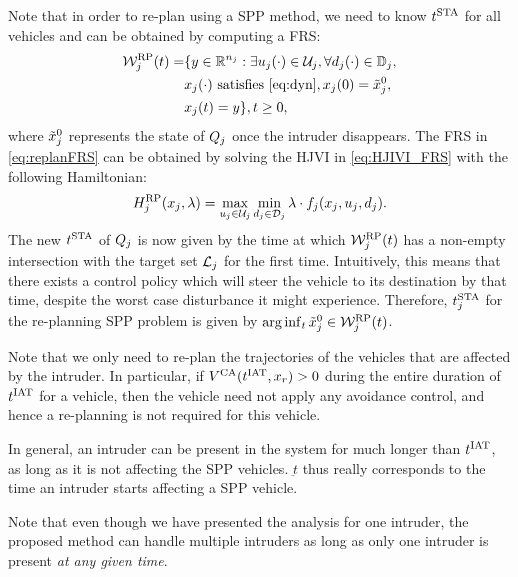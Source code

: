 Note that in order to re-plan using a SPP method, we need to know $t^\text{STA}$ for all vehicles and can be obtained by computing a FRS:
\begin{equation} \label{eq:replanFRS}
\begin{aligned} 
\frs_j^{\text{RP}}(t) = & \{y \in \R^{n_j}: \exists \ctrl_j(\cdot) \in \cset_j, \forall \dstb_j(\cdot) \in \dfset_j, \\
& \state_j(\cdot) \text{ satisfies \eqref{eq:dyn}}, \state_j(0) = \tilde{\state}_j^0, \\
& \state_j(t) = y\}, t \geq 0,
\end{aligned}
\end{equation}
where $\tilde{x}_j^0$ represents the state of $Q_j$ once the intruder disappears. The FRS in \eqref{eq:replanFRS} can be obtained by solving the HJVI in \eqref{eq:HJIVI_FRS} with the following Hamiltonian:
\begin{equation}
H_j^{\text{RP}}(x_j, \lambda) = \max_{u_j \in \mathcal{U}_j} \min_{d_j \in \mathcal{D}_j} \lambda \cdot f_j (x_j, u_j, d_j). 
\end{equation} 
The new $t^\text{STA}$ of $Q_j$ is now given by the time at which $\mathcal{W}_j^{\text{RP}}(t)$ has a non-empty intersection with the target set $\mathcal{L}_j$ for the first time. Intuitively, this means that there exists a control policy which will steer the vehicle to its destination by that time, despite the worst case disturbance it might experience. Therefore, $t^\text{STA}_j$ for the re-planning SPP problem is given by $\arg \inf_t \tilde{x}_j^0 \in \mathcal{W}_j^{\text{RP}}(t)$.

\begin{remark}
Note that we only need to re-plan the trajectories of the vehicles that are affected by the intruder. In particular, if $V^{\text{CA}}(t^\text{IAT}, x_r) > 0$ during the entire duration of $t^\text{IAT}$ for a vehicle, then the vehicle need not apply any avoidance control, and hence a re-planning is not required for this vehicle. 
\end{remark}

\begin{remark}
In general, an intruder can be present in the system for much longer than $t^\text{IAT}$, as long as it is not affecting the SPP vehicles. $\underbar{t}$ thus really corresponds to the time an intruder starts affecting a SPP vehicle.
\end{remark}

\begin{remark}
Note that even though we have presented the analysis for one intruder, the proposed method can handle multiple intruders as long as only one intruder is present \textit{at any given time}. 
\end{remark}


